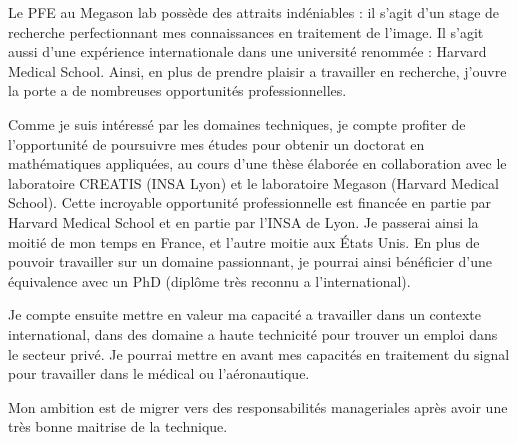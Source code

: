 Le PFE au Megason lab possède des attraits indéniables :
il s'agit d'un stage de recherche perfectionnant mes connaissances en traitement de l'image.
Il s'agit aussi d'une expérience internationale dans une université renommée : Harvard Medical School.
Ainsi, en plus de prendre plaisir a travailler en recherche, j'ouvre la porte a de nombreuses opportunités professionnelles.

Comme je suis intéressé par les domaines techniques,
je compte profiter de l'opportunité de poursuivre mes études pour obtenir un doctorat en mathématiques appliquées,
au cours d'une thèse élaborée en collaboration avec le laboratoire CREATIS (INSA Lyon)
et le laboratoire Megason (Harvard Medical School).
Cette incroyable opportunité professionnelle est financée en partie par Harvard Medical School
et en partie par l'INSA de Lyon. Je passerai ainsi la moitié de mon temps en France, et l'autre moitie aux États Unis.
En plus de pouvoir travailler sur un domaine passionnant,
je pourrai ainsi bénéficier d'une équivalence avec un PhD (diplôme très reconnu a l'international). 

Je compte ensuite mettre en valeur ma capacité a travailler dans un contexte international,
dans des domaine a haute technicité pour trouver un emploi dans le secteur privé.
Je pourrai mettre en avant mes capacités en traitement du signal pour travailler dans le médical ou l'aéronautique.

Mon ambition est de migrer vers des responsabilités manageriales après avoir une très bonne maitrise de la technique.

